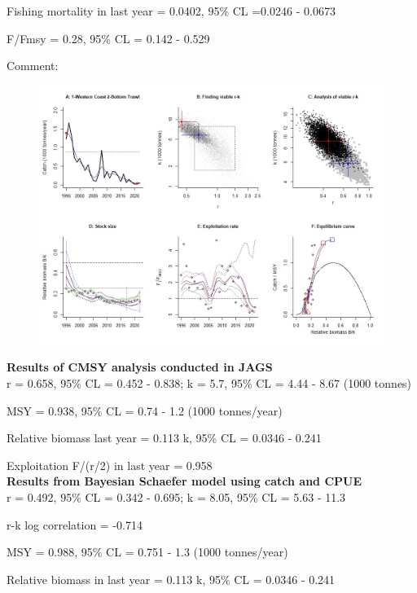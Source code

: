\documentclass[12pt,a4paper]{article}\usepackage[]{graphicx}\usepackage[]{xcolor}
\begin{document}
Fishing mortality in last year = 0.0402, 95\% CL =0.0246 - 0.0673

F/Fmsy  = 0.28, 95\% CL = 0.142 - 0.529 

 Comment:  

    \pagebreak

    \begin{figure}[ht]
    \centering
    \includegraphics[width=1.00\textwidth ext=.jpg type=jpg]{1-Western Coast 2-Bottom Trawl_AN.jpg}
    \end{figure}

    \textbf{Results of CMSY analysis conducted in JAGS}\\

r = 0.658, 95\% CL = 0.452 - 0.838; k = 5.7, 95\% CL = 4.44 - 8.67 (1000 tonnes)

MSY = 0.938, 95\% CL = 0.74 - 1.2 (1000 tonnes/year)

Relative biomass last year = 0.113 k, 95\% CL = 0.0346 - 0.241

Exploitation F/(r/2) in last year = 0.958 \\

\textbf{Results from Bayesian Schaefer model using catch and CPUE}\\

r = 0.492, 95\% CL = 0.342 - 0.695; k = 8.05, 95\% CL = 5.63 - 11.3

r-k log correlation = -0.714

MSY = 0.988, 95\% CL = 0.751 - 1.3 (1000 tonnes/year)

Relative biomass in last year = 0.113 k, 95\% CL = 0.0346 - 0.241
\end{document}
